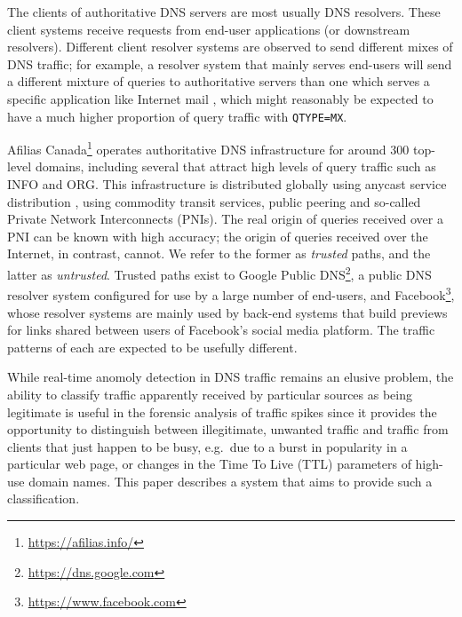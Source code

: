 \documentclass[conference]{IEEEtran}
\let\citep\cite
\begin{document}
The clients of authoritative DNS servers are most usually DNS resolvers.
These client systems receive requests from end-user applications (or
downstream resolvers). Different client resolver systems are observed to
send different mixes of DNS traffic; for example, a resolver system that
mainly serves end-users will send a different mixture of queries to
authoritative servers than one which serves a specific application like
Internet mail \citep{rfc5321}, which might reasonably be expected to
have a much higher proportion of query traffic with \texttt{QTYPE=MX}.

Afilias Canada\footnote{\url{https://afilias.info/}} operates
authoritative DNS infrastructure for around 300 top-level domains,
including several that attract high levels of query traffic such as INFO
and ORG. This infrastructure is distributed globally using anycast
service distribution \citep{rfc4786}, using commodity transit services,
public peering and so-called Private Network Interconnects (PNIs). The
real origin of queries received over a PNI can be known with high
accuracy; the origin of queries received over the Internet, in contrast,
cannot. We refer to the former as \emph{trusted} paths, and the latter
as \emph{untrusted}. Trusted paths exist to Google Public
DNS\footnote{\url{https://dns.google.com}}, a public DNS resolver system
configured for use by a large number of end-users, and
Facebook\footnote{\url{https://www.facebook.com}}, whose resolver
systems are mainly used by back-end systems that build previews for
links shared between users of Facebook's social media platform. The
traffic patterns of each are expected to be usefully different.

While real-time anomoly detection in DNS traffic remains an elusive
problem, the ability to classify traffic apparently received by
particular sources as being legitimate is useful in the forensic
analysis of traffic spikes since it provides the opportunity to
distinguish between illegitimate, unwanted traffic and traffic from
clients that just happen to be busy, e.g.~due to a burst in popularity
in a particular web page, or changes in the Time To Live (TTL)
parameters of high-use domain names. This paper describes a system that
aims to provide such a classification.
\end{document}
